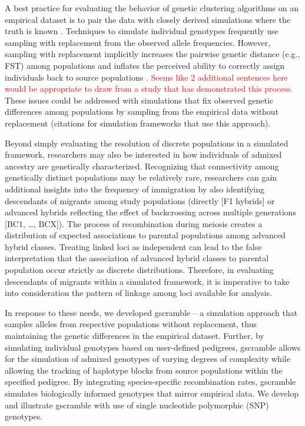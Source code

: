 A best practice for evaluating the behavior of genetic clustering algorithms on an empirical dataset is to pair the data with closely derived simulations where the truth is known \citep{vaha2006efficiency,anderson2008improved,latch2011fine}.
	Techniques to simulate individual genotypes frequently use sampling with replacement from the observed allele frequencies.
	However, sampling with replacement implicitly increases the pairwise genetic distance (e.g., FST) among populations and inflates the perceived ability to correctly assign individuals back to source populations \cite{almudevar2000exact,anderson2008improved}.
	\textcolor{red}{Seems like 2 additional sentences here would be appropriate to draw from a study that has demonstrated this process.}
	These issues could be addressed with simulations that fix observed genetic differences among populations by sampling from the empirical data without replacement (citations for simulation frameworks that use this approach).

	Beyond simply evaluating the resolution of discrete populations in a simulated framework, researchers may also be interested in how individuals of admixed ancestry are genetically characterized.
	Recognizing that connectivity among genetically distinct populations may be relatively rare, researchers can gain additional insights into the frequency of immigration by also identifying descendants of migrants among study populations (directly [F1 hybrids] or advanced hybrids reflecting the effect of backcrossing across multiple generations [BC1, \ldots, BCX]).
	The process of recombination during meiosis creates a distribution of expected associations to parental populations among advanced hybrid classes.
	Treating linked loci as independent can lead to the false interpretation that the association of advanced hybrid classes to parental population occur strictly as discrete distributions.
	Therefore, in evaluating descendants of migrants within a simulated framework, it is imperative to take into consideration the pattern of linkage among loci available for analysis.

	In response to these needs, we developed gscramble – a simulation approach that samples alleles from respective populations without replacement, thus maintaining the genetic differences in the empirical dataset.
	Further, by simulating individual genotypes based on user-defined pedigrees, gscramble allows for the simulation of admixed genotypes of varying degrees of complexity while allowing the tracking of haplotype blocks from source populations within the specified pedigree.
	By integrating species-specific recombination rates, gscramble simulates biologically informed genotypes that mirror empirical data.
	We develop and illustrate gscramble with use of single nucleotide polymorphic (SNP) genotypes.




